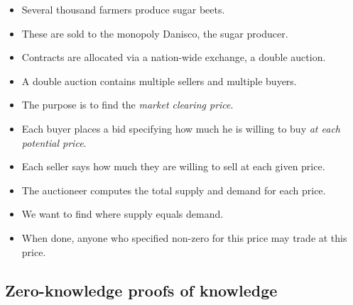 \begin{frame}
  \begin{example}
    \begin{itemize}
      \item Several thousand farmers produce sugar beets.
      \item These are sold to the monopoly Danisco, the sugar producer.

        \pause{}

      \item Contracts are allocated via a nation-wide exchange, a double 
        auction.

      \item A double auction contains multiple sellers and multiple buyers.

      \item The purpose is to find the \emph{market clearing price}.

    \end{itemize}
  \end{example}
\end{frame}

\begin{frame}
  \begin{example}
    \begin{itemize}
      \item Each buyer places a bid specifying how much he is willing to buy 
        \emph{at each potential price}.

      \item Each seller says how much they are willing to sell at each given 
        price.

        \pause{}

      \item The auctioneer computes the total supply and demand for each price.

      \item We want to find where supply equals demand.

        \pause{}

      \item When done, anyone who specified non-zero for this price may trade 
        at this price.
    \end{itemize}
  \end{example}
\end{frame}

\subsection{Zero-knowledge proofs of knowledge}

